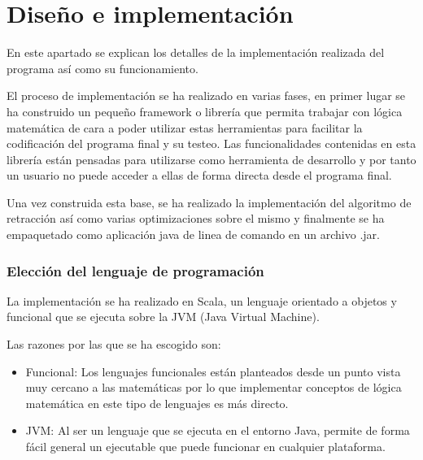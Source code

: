 



\chapter*{Diseño e implementación}
	
	En este apartado se explican los detalles de la implementación realizada del programa así como su funcionamiento.
	
	El proceso de implementación se ha realizado en varias fases, en primer lugar se ha construido un pequeño framework o librería que permita trabajar con lógica matemática de cara a poder utilizar estas herramientas para facilitar la codificación del programa final y su testeo. Las funcionalidades contenidas en esta librería están pensadas para utilizarse como herramienta de desarrollo y por tanto un usuario no puede acceder a ellas de forma directa desde el programa final.
	
	Una vez construida esta base, se ha realizado la implementación del algoritmo de retracción así como varias optimizaciones sobre el mismo y finalmente se ha empaquetado como aplicación java de linea de comando en un archivo .jar.

\subsection*{Elección del lenguaje de programación}
	
	
	La implementación se ha realizado en Scala, un lenguaje orientado a objetos y funcional que se ejecuta sobre la JVM (Java Virtual Machine).
	
	Las razones por las que se ha escogido son:
	
	\begin{itemize}
		
		\item Funcional: Los lenguajes funcionales están planteados desde un punto vista muy cercano a las matemáticas por lo que implementar
		conceptos de lógica matemática en este tipo de lenguajes es más directo.
		
		\item JVM: Al ser un lenguaje que se ejecuta en el entorno Java, permite de forma fácil general un ejecutable que puede funcionar en cualquier plataforma.
		
	\end{itemize}




